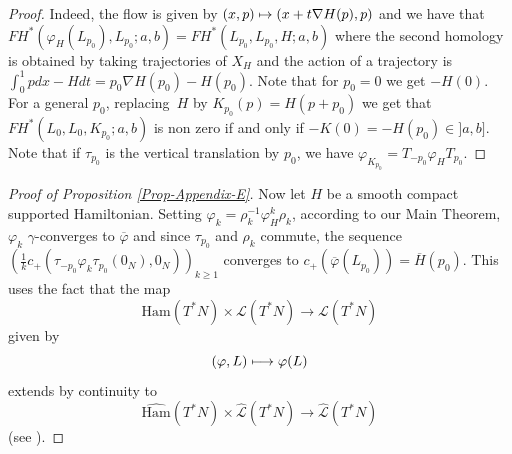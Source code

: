 \documentclass[JEP,XML,SOM,NoFloatCountersInSection,Unicode,published]{cedram}
\newcommand\mto{\mathchoice{\longmapsto}{\mapsto}{\mapsto}{\mapsto}}
\numberwithin{equation}{section}
\newcommand {\DHam}{\mathrm{Ham}}
\newcommand{\gclDHam}[1]{\widehat{\DHam}(#1)}
\theoremstyle{plain}
\theoremstyle{definition}
\theoremstyle{remark}
\begin{document}
\begin{proof}
Indeed, the flow is given by $(x,p) \mto (x+t\nabla H(p), p)$ and we have that $FH^*(\varphi_H(L_{p_0}),L_{p_0};a,b)=FH^*(L_{p_0},L_{p_0},H;a,b)$ where the second homology is obtained by taking trajectories of $X_H$ and the action of a trajectory is $\int_0^1 pdx - H dt =p_0 \nabla H(p_0) -H(p_0)$. Note that for $p_0=0$ we get $-H(0)$. For a general $p_0$, replacing~$H$ by $K_{p_0}(p)=H(p+p_0)$ we get that $FH^*(L_{0},L_{0},K_{p_0};a,b)$ is non zero if and only if $-K(0)=-H(p_0)\in ]a,b]$. Note that if $\tau_{p_0}$ is the vertical translation by $p_0$, we have $\varphi_{K_{p_0}} =T_{-p_0}\varphi_H T_{p_0}$.
\end{proof}
\begin{proof} [Proof of Proposition \ref{Prop-Appendix-E}]
Now let $H$ be a smooth compact supported Hamiltonian. Setting $\varphi_k= \rho_k^{-1}\varphi_H^k\rho_k$, according to our Main Theorem, $\varphi_k$ $\gamma$-converges to $\overline \varphi$ and since $\tau_{p_0}$ and $\rho_k$ commute,
the sequence $\left (\frac{1}{k} c_+(\tau_{-p_0}{\varphi_k} \tau_{p_0}(0_N), 0_N)\right)_{k\geq 1}$ converges to $c_+(\overline \varphi (L_{p_0}))=\overline H(p_0)$. This uses the fact that the map
\[
{\DHam}(T^*N) \times {\mathcal L}(T^*N) \to {\mathcal L}(T^*N)
\]
given by
\[
(\varphi, L) \mto \varphi(L)
\]
extends by continuity to
\[
\gclDHam{T^*N} \times \widehat {\mathcal L}(T^*N) \to \widehat {\mathcal L}(T^*N)
\]
(see \cite[Prop.\,4.3]{Humiliere}).
\end{proof}

\backmatter


\end{document}
